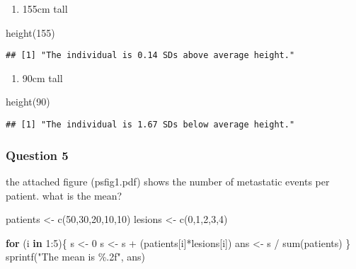 \documentclass[
]{article}
\newenvironment{Shaded}{\begin{snugshade}}{\end{snugshade}}
\newcommand{\ControlFlowTok}[1]{\textcolor[rgb]{0.13,0.29,0.53}{\textbf{#1}}}
\newcommand{\DecValTok}[1]{\textcolor[rgb]{0.00,0.00,0.81}{#1}}
\newcommand{\FunctionTok}[1]{\textcolor[rgb]{0.00,0.00,0.00}{#1}}
\newcommand{\NormalTok}[1]{#1}
\newcommand{\OtherTok}[1]{\textcolor[rgb]{0.56,0.35,0.01}{#1}}
\newcommand{\SpecialCharTok}[1]{\textcolor[rgb]{0.00,0.00,0.00}{#1}}
\newcommand{\StringTok}[1]{\textcolor[rgb]{0.31,0.60,0.02}{#1}}
\providecommand{\tightlist}{%
  \setlength{\itemsep}{0pt}\setlength{\parskip}{0pt}}
\begin{document}
\begin{enumerate}
\def\labelenumi{\roman{enumi})}
\setcounter{enumi}{2}
\tightlist
\item
  155cm tall
\end{enumerate}

\begin{Shaded}
\begin{Highlighting}[]
\FunctionTok{height}\NormalTok{(}\DecValTok{155}\NormalTok{)}
\end{Highlighting}
\end{Shaded}

\begin{verbatim}
## [1] "The individual is 0.14 SDs above average height."
\end{verbatim}

\begin{enumerate}
\def\labelenumi{\roman{enumi})}
\setcounter{enumi}{3}
\tightlist
\item
  90cm tall
\end{enumerate}

\begin{Shaded}
\begin{Highlighting}[]
\FunctionTok{height}\NormalTok{(}\DecValTok{90}\NormalTok{)}
\end{Highlighting}
\end{Shaded}

\begin{verbatim}
## [1] "The individual is 1.67 SDs below average height."
\end{verbatim}

\hypertarget{question-5}{%
\subsubsection{Question 5}\label{question-5}}

the attached figure (psfig1.pdf) shows the number of metastatic events
per patient. what is the mean?

\begin{Shaded}
\begin{Highlighting}[]
\NormalTok{patients }\OtherTok{\textless{}{-}} \FunctionTok{c}\NormalTok{(}\DecValTok{50}\NormalTok{,}\DecValTok{30}\NormalTok{,}\DecValTok{20}\NormalTok{,}\DecValTok{10}\NormalTok{,}\DecValTok{10}\NormalTok{)}
\NormalTok{lesions }\OtherTok{\textless{}{-}} \FunctionTok{c}\NormalTok{(}\DecValTok{0}\NormalTok{,}\DecValTok{1}\NormalTok{,}\DecValTok{2}\NormalTok{,}\DecValTok{3}\NormalTok{,}\DecValTok{4}\NormalTok{)}

\ControlFlowTok{for}\NormalTok{ (i }\ControlFlowTok{in} \DecValTok{1}\SpecialCharTok{:}\DecValTok{5}\NormalTok{)\{}
\NormalTok{  s }\OtherTok{\textless{}{-}}  \DecValTok{0}
\NormalTok{  s }\OtherTok{\textless{}{-}}\NormalTok{ s }\SpecialCharTok{+}\NormalTok{ (patients[i]}\SpecialCharTok{*}\NormalTok{lesions[i])}
\NormalTok{  ans }\OtherTok{\textless{}{-}}\NormalTok{ s }\SpecialCharTok{/} \FunctionTok{sum}\NormalTok{(patients)}
\NormalTok{\}}
\FunctionTok{sprintf}\NormalTok{(}\StringTok{"The mean is \%.2f"}\NormalTok{, ans)}
\end{Highlighting}
\end{Shaded}
\end{document}
